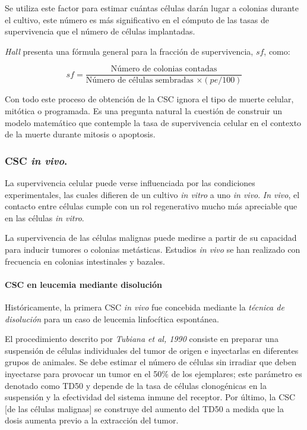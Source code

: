 \documentclass[12pt,letterpaper, oneside]{book}
\begin{document}
				Se utiliza este factor para estimar cuántas células darán lugar a colonias durante el cultivo\cite{Hall.2000}, este número es más significativo en el cómputo de las tasas de supervivencia que el número de células implantadas.
				
				\textit{Hall} presenta una fórmula general para la fracción de supervivencia, $sf$, como:

				\begin{equation}
				sf=\frac{\textrm{Número de colonias contadas}}{\textrm{Número de células sembradas $\times (pe/100)$}}
				\end{equation}
				
				Con todo este proceso de obtención de la CSC ignora el tipo de muerte celular, mitótica o programada\cite{Hall.2000}. Es una pregunta natural la cuestión de construir un modelo matemático que contemple la tasa de supervivencia celular en el contexto de la muerte durante mitosis o apoptosis. 
				
				\subsubsection{CSC \textit{in vivo}.}
				La supervivencia celular puede verse influenciada por las condiciones experimentales, las cuales difieren de un cultivo \textit{in vitro} a uno \textit{in vivo}\cite{Tubiana.1990}. \textit{In vivo}, el contacto entre células cumple con un rol regenerativo mucho más apreciable que en las células \textit{in vitro}\cite{Tubiana.1990}. 
				
				La supervivencia de las células malignas puede medirse a partir de su capacidad para inducir tumores o colonias metásticas\cite{Tubiana.1990}. Estudios \textit{in vivo} se han realizado con frecuencia en colonias intestinales y bazales\cite{Tubiana.1990}. 
				
				\paragraph{CSC en leucemia mediante disolución \newline}
				Históricamente, la primera CSC \textit{in vivo} fue concebida mediante la \textit{técnica de disolución} para un caso de leucemia linfocítica espontánea\cite{Tubiana.1990}. 
				
				El procedimiento descrito por \textit{Tubiana et al, 1990} consiste en preparar una suspensión de células individuales del tumor de origen e inyectarlas en diferentes grupos de animales. Se debe estimar el número de células sin irradiar que deben inyectarse para provocar un tumor en el 50\% de los ejemplares; este parámetro es denotado como TD50 y depende de la tasa de células clonogénicas en la suspensión y la efectividad del sistema inmune del receptor. Por último, la CSC [de las células malignas] se construye del aumento del TD50 a medida que la dosis aumenta previo a la extracción del tumor.   
				
\end{document}
